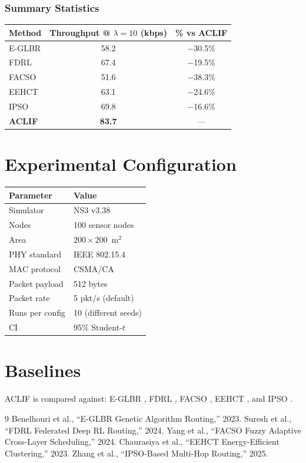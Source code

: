 \documentclass[a4paper,12pt]{article}
\begin{document}
\subsubsection*{Summary Statistics}
\begin{tabular}{lcc}
\toprule
Method & Throughput @ $\lambda{=}10$ (kbps) & \% vs ACLIF \\
\midrule
E-GLBR & 58.2  & $-$30.5\% \\
FDRL   & 67.4  & $-$19.5\% \\
FACSO  & 51.6  & $-$38.3\% \\
EEHCT  & 63.1  & $-$24.6\% \\
IPSO   & 69.8  & $-$16.6\% \\
\textbf{ACLIF} & \textbf{83.7} & --- \\
\bottomrule
\end{tabular}

\section{Experimental Configuration}
\begin{tabular}{ll}
\toprule
\textbf{Parameter} & \textbf{Value} \\
\midrule
Simulator      & NS3 v3.38 \\
Nodes          & 100 sensor nodes \\
Area           & $200 \times 200$~m$^2$ \\
PHY standard   & IEEE 802.15.4 \\
MAC protocol   & CSMA/CA \\
Packet payload & 512 bytes \\
Packet rate    & 5 pkt/s (default) \\
Runs per config & 10 (different seeds) \\
CI             & 95\% Student-$t$ \\
\bottomrule
\end{tabular}

\section{Baselines}
ACLIF is compared against: E-GLBR \cite{Benelhouri2023}, FDRL \cite{Suresh2024},
FACSO \cite{Yang2024204}, EEHCT \cite{Chaurasiya202325941}, and IPSO \cite{Zhang2025}.

\begin{thebibliography}{9}
 Benelhouri et al., ``E-GLBR Genetic Algorithm Routing,'' 2023.
 Suresh et al., ``FDRL Federated Deep RL Routing,'' 2024.
 Yang et al., ``FACSO Fuzzy Adaptive Cross-Layer Scheduling,'' 2024.
 Chaurasiya et al., ``EEHCT Energy-Efficient Clustering,'' 2023.
 Zhang et al., ``IPSO-Based Multi-Hop Routing,'' 2025.
\end{thebibliography}
\end{document}
